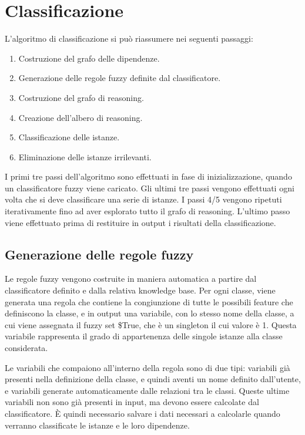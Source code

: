 \section{Classificazione}

L'algoritmo di classificazione si può riassumere nei seguenti passaggi:

\begin{enumerate} 
 \item Costruzione del grafo delle dipendenze.
 \item Generazione delle regole fuzzy definite dal classificatore.
 \item Costruzione del grafo di reasoning.
 \item Creazione dell'albero di reasoning.
 \item Classificazione delle istanze.
 \item Eliminazione delle istanze irrilevanti.
\end{enumerate}

I primi tre passi dell'algoritmo sono effettuati in fase di inizializzazione, quando un classificatore fuzzy viene caricato.
Gli ultimi tre passi vengono effettuati ogni volta che si deve classificare una serie di istanze.
I passi 4/5 vengono ripetuti iterativamente fino ad aver esplorato tutto il grafo di reasoning.
L'ultimo passo viene effettuato prima di restituire in output i risultati della classificazione.

\subsection{Generazione delle regole fuzzy}

Le regole fuzzy vengono costruite in maniera automatica a partire dal classificatore definito e dalla relativa knowledge base. Per ogni classe, viene generata una regola che contiene la congiunzione di tutte le possibili feature che definiscono la classe, e in output una variabile, con lo stesso nome della classe, a cui viene assegnata il fuzzy set \$True, che è un singleton il cui valore è 1. Questa variabile rappresenta il grado di appartenenza delle singole istanze alla classe considerata.

Le variabili che compaiono all'interno della regola sono di due tipi: variabili già presenti nella definizione della classe, e quindi aventi un nome definito dall'utente, e variabili generate automaticamente dalle relazioni tra le classi. Queste ultime variabili non sono già presenti in input, ma devono essere calcolate dal classificatore. \`E quindi necessario salvare i dati necessari a calcolarle quando verranno classificate le istanze e le loro dipendenze.

